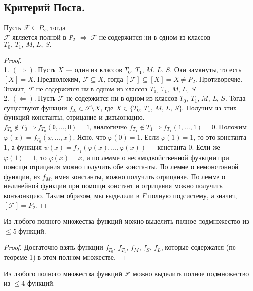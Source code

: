 \subsection{Критерий Поста.}
\begin{theorem} Пусть $\mathcal{F} \subseteq P_2$, тогда \\ $\mathcal{F}$ является полной в $P_2$ $\Longleftrightarrow$ $\mathcal{F}$ не содержится ни в одном из классов $ T_0,\, T_1,\,M,\,L,\,S.$
\end{theorem}
\begin{proof}
~\\
1. $(\Rightarrow)$. Пусть $X$ --- один из классов $ T_0,\, T_1,\,M,\,L,\,S$. Они замкнуты, то есть $[X] = X$.
Предположим, $\mathcal{F} \subseteq X $, тогда $[\mathcal{F}] \subseteq [X] = X \neq P_2 $. Противоречие. Значит, $\mathcal{F}$ не содержится ни в одном из классов $ T_0,\, T_1,\,M,\,L,\,S.$
~\\
2. $(\Leftarrow)$. Пусть $\mathcal{F}$ не содержится ни в одном из классов $ T_0,\, T_1,\,M,\,L,\,S$. Тогда существуют функции $f_X \in \mathcal{F} \setminus X$, где $X \in \{T_0,\, T_1,\,M,\,L,\,S\}$. Получим из этих функций константы, отрицание и дизъюнкцию. \\
$f_{T_0} \not\in T_0 \Rightarrow f_{T_0} (0,\ldots,0) = 1 $, аналогично $f_{T_1} \not\in T_1 \Rightarrow f_{T_1} (1,\ldots,1) = 0 $. Положим $\varphi (x) = f_{T_0}(x,\ldots,x)$. Ясно, что $\varphi (0) = 1$. Если $\varphi(1) = 1$, то это константа $1$,  а функция $\psi (x) = f_{T_1}(\varphi (x),\ldots,\varphi(x))$ --- константа $0$. Если же $\varphi(1) = 1$, то $\varphi (x) = \bar{x}$, и по лемме о несамодвойственной функции при помощи отрицания можно получить обе константы. По лемме о немонотонной функции, из $f_M$, имея константы, можно получить отрицание. По лемме о нелинейной функции при помощи констант и отрицания можно получить конъюнкцию. Таким образом, мы выделили в $F$ полную подсистему, а значит, $[\mathcal{F}] = P_2$. 
\end{proof}
\begin{corollary}
Из любого полного множества функций можно выделить полное подмножество из $\leq 5$ функций.
\end{corollary}
\begin{proof}
Достаточно взять функции $f_{T_0},\,f_{T_1},\,f_M,\,f_S,\,f_L$, которые содержатся (по теореме 1) в этом полном множестве.
\end{proof}
\begin{corollary} 
Из любого полного множества функций $\mathcal{F}$ можно выделить полное подмножество из $\leq 4$ функций.
\end{corollary}
